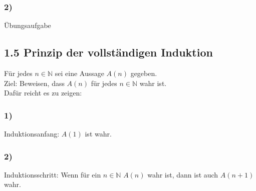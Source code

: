 \documentclass[11pt, oneside, a4paper]{article}
\begin{document}
\subsubsection*{2)}
Übungsaufgabe
\newpage
{}
\subsection*{1.5 Prinzip der vollständigen Induktion}
Für jedes $n \in \mathbb{N}$ sei eine Aussage $A(n)$ gegeben. \\
Ziel: Beweisen, dass $A(n)$ für jedes $n \in \mathbb{N}$ wahr ist.\\
Dafür reicht es zu zeigen:
\subsubsection*{1)}
Induktionsanfang: $A(1)$ ist wahr. 
\subsubsection*{2)}
Induktionsschritt: Wenn für ein $n \in \mathbb{N}$ $A(n)$ wahr ist, dann ist auch $A(n+1)$ wahr.
\end{document}
